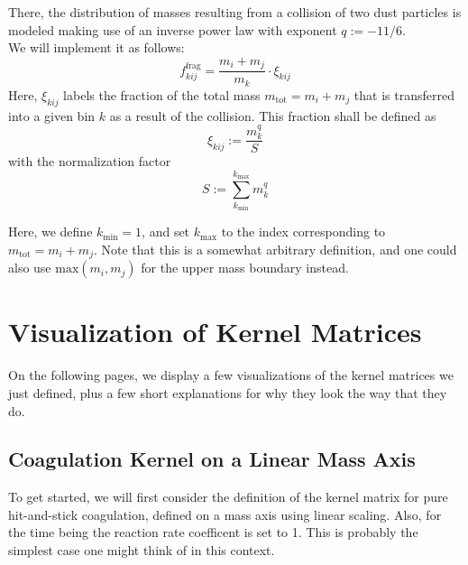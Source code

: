         There, the distribution of masses resulting from a collision of two dust particles 
        is modeled making use of an inverse power law with exponent $q := - 11/6$. \\

        We will implement it as follows:
        \begin{equation}
            f^\text{frag}_{kij} = \frac{m_i + m_j}{m_k} \cdot \xi_{kij}
        \end{equation}
        Here, $\xi_{kij}$ labels the fraction of the total mass $m_\text{tot} = m_i + m_j$ that 
        is transferred into a given bin $k$ as a result of the collision. 
        This fraction shall be defined as 
        \begin{equation}
            \xi_{kij} := \frac{m_k^q}{S}
        \end{equation}
        with the normalization factor
        \begin{equation}
            S := \sum_{k_\text{min}}^{k_\text{max}} m_k^q %
        \end{equation}

        Here, we define $k_\text{min}=1$, and set $k_\text{max}$ to the index corresponding
        to $m_\text{tot} = m_i + m_j$. Note that this is a somewhat arbitrary definition, and 
        one could also use $\text{max}(m_i, m_j)$ for the upper mass boundary instead.



\clearpage\section{Visualization of Kernel Matrices}
    
    On the following pages, we display a few visualizations of the kernel matrices we just 
    defined, plus a few short explanations for why they look the way that they do.

    \subsection{Coagulation Kernel on a Linear Mass Axis}
    \label{sec:coagulation_kernel_on_linear_mass_axis}

        To get started, we will first consider the definition of the kernel matrix 
        for pure hit-and-stick coagulation, defined on a mass axis using linear scaling.
        Also, for the time being the reaction rate coefficent is set to 1.
        This is probably the simplest case one might think of in this context. \\


